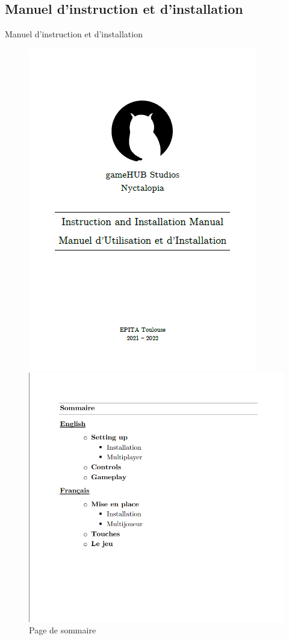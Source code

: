 \subsection{Manuel d'instruction et d'installation}
\begin{frame}{Manuel d'instruction et d'installation}

\begin{figure}[H]
\centering
\begin{minipage}{.5\textwidth}
  \centering
  \includegraphics[width=.5\linewidth]{img/M1.png}
  \caption{Page d'accueil}
  \label{fig:houses}
\end{minipage}%
\begin{minipage}{.5\textwidth}
  \centering
  \includegraphics[width=.7\linewidth]{img/M4.png}
  \caption{Page de sommaire}
  \label{fig:military}
\end{minipage}
\end{figure}

\end{frame}